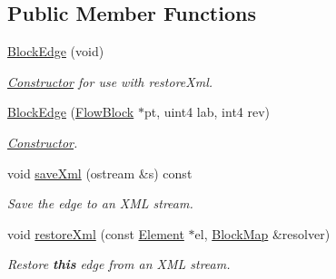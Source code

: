 \subsection*{Public Member Functions}
\begin{DoxyCompactItemize}
\item 
\mbox{\hyperlink{struct_block_edge_a6df7a3987c1be015a0ba41f3e6e90b3c}{Block\+Edge}} (void)
\begin{DoxyCompactList}\small\item\em \mbox{\hyperlink{class_constructor}{Constructor}} for use with restore\+Xml. \end{DoxyCompactList}\item 
\mbox{\hyperlink{struct_block_edge_a150bd75f391dbef47afe40387873edce}{Block\+Edge}} (\mbox{\hyperlink{class_flow_block}{Flow\+Block}} $\ast$pt, uint4 lab, int4 rev)
\begin{DoxyCompactList}\small\item\em \mbox{\hyperlink{class_constructor}{Constructor}}. \end{DoxyCompactList}\item 
void \mbox{\hyperlink{struct_block_edge_a2ab8ffe65ffd12f7fa0e682395549fc4}{save\+Xml}} (ostream \&s) const
\begin{DoxyCompactList}\small\item\em Save the edge to an X\+ML stream. \end{DoxyCompactList}\item 
void \mbox{\hyperlink{struct_block_edge_ab1e094751e834170c101f2a29302572a}{restore\+Xml}} (const \mbox{\hyperlink{class_element}{Element}} $\ast$el, \mbox{\hyperlink{class_block_map}{Block\+Map}} \&resolver)
\begin{DoxyCompactList}\small\item\em Restore {\bfseries{this}} edge from an X\+ML stream. \end{DoxyCompactList}\end{DoxyCompactItemize}

